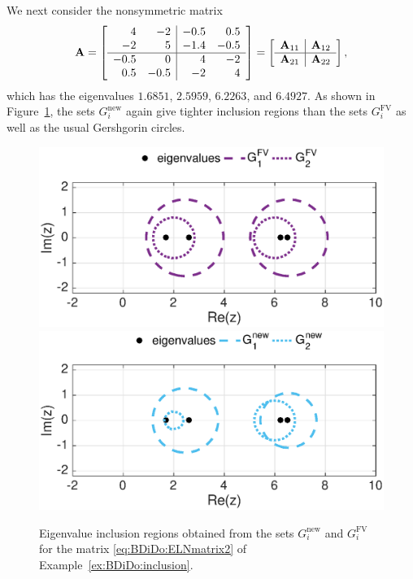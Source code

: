 \begin{example}
{We next consider the nonsymmetric matrix
\begin{equation}\label{eq:BDiDo:ELNmatrix2}
\mathbf{A}=
\left[ \begin{array}{rr|rr}
4	& -2	& -0.5 & 0.5	\\
-2	&	5	&  -1.4 & -0.5	\\ \hline
-0.5	& 0	&	4	&-2	\\
0.5	& -0.5	& -2	& 4
\end{array} \right]
=
\left[ \begin{array}{c|c}
\mathbf{A}_{11}	& \mathbf{A}_{12}	\\ \hline
\mathbf{A}_{21}	& \mathbf{A}_{22}
\end{array} \right],
\end{equation}
which has the eigenvalues $1.6851$, $2.5959$, $6.2263$, and $6.4927$. As shown
in \textnormal{Figure~\ref{fig:BDiDo:ex:inclusion2}}, the sets
$G_i^{\text{new}}$ again give tighter inclusion regions than the sets
$G_i^{\text{FV}}$ as well as the usual Gershgorin circles.
%
\begin{figure}[tbph]
\centering
\vspace*{-0.4cm}
\includegraphics[width=0.49\linewidth]{figures/Example415_b1}
\includegraphics[width=0.49\linewidth]{figures/Example415_b2}
\vspace*{-0.5cm}
\caption{Eigenvalue inclusion regions obtained from the sets
$G_i^{\text{new}}$ and $G_i^{\text{FV}}$ for the matrix \eqref{eq:BDiDo:ELNmatrix2} of Example~\ref{ex:BDiDo:inclusion}.}
\label{fig:BDiDo:ex:inclusion2}
\end{figure}
}\end{example}


